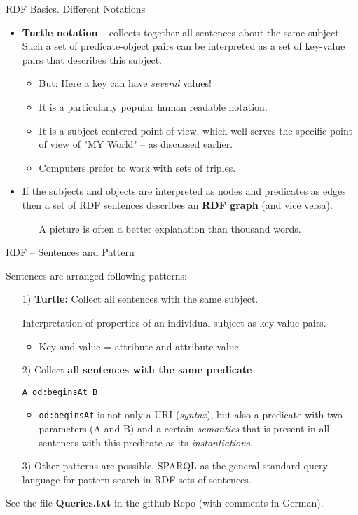 \documentclass{beamer}
\begin{document}
\begin{frame}{RDF Basics. Different Notations}
  \begin{itemize}
  \item \textbf{Turtle notation} -- collects together all sentences about the
    same subject. Such a set of predicate-object pairs can be interpreted as a
    set of key-value pairs that describes this subject.
    \begin{itemize}
    \item But: Here a key can have \emph{several} values!
    \item It is a particularly popular human readable notation.
    \item It is a subject-centered point of view, which well serves the
      specific point of view of "MY World" -- as discussed earlier.
    \item Computers prefer to work with sets of triples.
    \end{itemize}
  \item If the subjects and objects are interpreted as nodes and predicates as
    edges then a set of RDF sentences describes an \textbf{RDF graph} (and
    vice versa).
    \begin{itemize}
    \item[] A picture is often a better explanation than thousand words.
    \end{itemize}
  \end{itemize}
\end{frame}
\begin{frame}{RDF -- Sentences and Pattern}
  
Sentences are arranged following patterns:
\begin{itemize}
\item[1)] \textbf{Turtle:} Collect all sentences with the same subject.
  
  Interpretation of properties of an individual subject as key-value pairs.
  \begin{itemize}
  \item Key and value = attribute and attribute value
  \end{itemize}
\item[2)] Collect \textbf{all sentences with the same predicate}
  \begin{center}\tt    A od:beginsAt B  \end{center}
  \begin{itemize}
  \item \texttt{od:beginsAt} is not only a URI (\emph{syntax}), but also a
    predicate with two parameters (A and B) and a certain \emph{semantics}
    that is present in all sentences with this predicate as its
    \emph{instantiations}.
  \end{itemize}
\item[3)] Other patterns are possible, SPARQL as the general standard
  query language for pattern search in RDF sets of sentences.
\end{itemize}
See the file \textbf{Queries.txt} in the github Repo (with comments in
German).
\end{frame}
\end{document}

